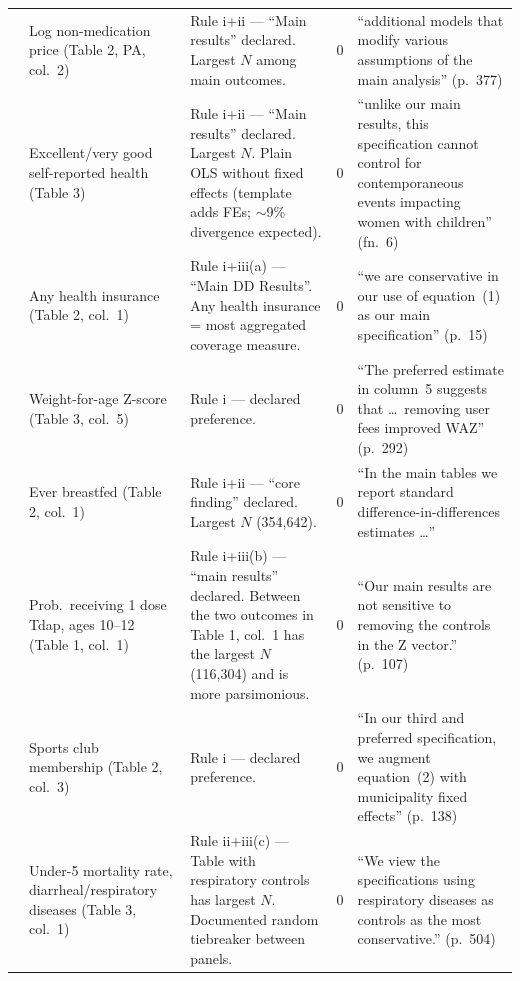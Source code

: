 \begin{small}
\begin{longtable}{p{2.2cm} p{3.0cm} p{5.5cm} p{0.8cm} p{4cm}}
\textcite{schmitt2018multimarket}
& Log non-medication price (Table 2, PA, col.~2)
& Rule i+ii --- ``Main results'' declared. Largest $N$ among main outcomes.
& 0
& ``additional models that modify various assumptions of the main analysis'' (p.~377) \\

\textcite{evans2014giving}
& Excellent/very good self-reported health (Table 3)
& Rule i+ii --- ``Main results'' declared. Largest $N$. Plain OLS without fixed effects (template adds FEs; $\sim$9\% divergence expected).
& 0
& ``unlike our main results, this specification cannot control for contemporaneous events impacting women with children'' (fn.~6) \\

\textcite{akosaantwi2013effects}
& Any health insurance (Table 2, col.~1)
& Rule i+iii(a) --- ``Main DD Results''. Any health insurance = most aggregated coverage measure.
& 0
& ``we are conservative in our use of equation~(1) as our main specification'' (p.~15) \\

\textcite{tanaka2014abolishing}
& Weight-for-age Z-score (Table 3, col.~5)
& Rule i --- declared preference.
& 0
& ``The preferred estimate in column~5 suggests that \ldots\ removing user fees improved WAZ'' (p.~292) \\

\textcite{lawler2023effect}
& Ever breastfed (Table 2, col.~1)
& Rule i+ii --- ``core finding'' declared. Largest $N$ (354,642).
& 0
& ``In the main tables we report standard difference-in-differences estimates \ldots'' \\

\textcite{carpenter2019direct}
& Prob.\ receiving 1 dose Tdap, ages 10--12 (Table 1, col.~1)
& Rule i+iii(b) --- ``main results'' declared. Between the two outcomes in Table 1, col.~1 has the largest $N$ (116,304) and is more parsimonious.
& 0
& ``Our main results are not sensitive to removing the controls in the Z vector.'' (p.~107) \\

\textcite{marcus2022long}
& Sports club membership (Table 2, col.~3)
& Rule i --- declared preference.
& 0
& ``In our third and preferred specification, we augment equation~(2) with municipality fixed effects'' (p.~138) \\

\textcite{bhalotra2021urban}
& Under-5 mortality rate, diarrheal/respiratory diseases (Table 3, col.~1)
& Rule ii+iii(c) --- Table with respiratory controls has largest $N$. Documented random tiebreaker between panels.
& 0
& ``We view the specifications using respiratory diseases as controls as the most conservative.'' (p.~504) \\


\end{longtable}
\end{small}
